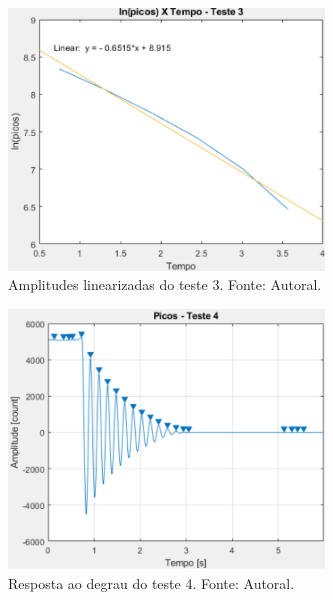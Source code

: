 \documentclass{ifacconf}
\begin{document}
\begin{figure}[!htb]
  \begin{center}
  \includegraphics[width=8.4cm]{figures/regressao_teste_3.png}    %
  \caption{Amplitudes linearizadas do teste 3. Fonte: Autoral.} 
  \label{fig:regressao_teste_3}
  \end{center}
\end{figure}

\begin{figure}[!htb]
  \begin{center}
  \includegraphics[width=8.4cm]{figures/picos_teste_4.png}    %
  \caption{Resposta ao degrau do teste 4. Fonte: Autoral.} 
  \label{fig:picos_teste_4}
  \end{center}
\end{figure}
\end{document}
